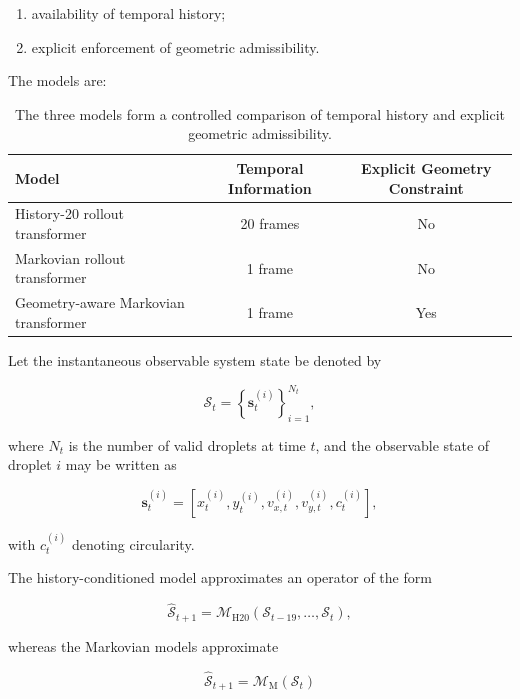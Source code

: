 \documentclass[11pt]{article}
\newcommand{\Mhist}{\mathcal{M}_{\mathrm{H20}}}
\newcommand{\Mmark}{\mathcal{M}_{\mathrm{M}}}
\begin{document}
\begin{enumerate}
    \item availability of temporal history;
    \item explicit enforcement of geometric admissibility.
\end{enumerate}

The models are:

\begin{table}[h]
\centering
\begin{tabular}{lcc}
\toprule
Model & Temporal Information & Explicit Geometry Constraint \\
\midrule
History-20 rollout transformer & 20 frames & No \\
Markovian rollout transformer & 1 frame & No \\
Geometry-aware Markovian transformer & 1 frame & Yes \\
\bottomrule
\end{tabular}
\caption{The three models form a controlled comparison of temporal history and explicit geometric admissibility.}
\end{table}

Let the instantaneous observable system state be denoted by

\begin{equation}
\mathcal{S}_t
=
\left\{
\mathbf{s}_t^{(i)}
\right\}_{i=1}^{N_t},
\end{equation}

where \(N_t\) is the number of valid droplets at time \(t\), and the observable state of droplet \(i\) may be written as

\begin{equation}
\mathbf{s}_t^{(i)}
=
\left[
x_t^{(i)},
y_t^{(i)},
v_{x,t}^{(i)},
v_{y,t}^{(i)},
c_t^{(i)}
\right],
\end{equation}

with \(c_t^{(i)}\) denoting circularity.

The history-conditioned model approximates an operator of the form

\begin{equation}
\hat{\mathcal{S}}_{t+1}
=
\Mhist
\left(
\mathcal{S}_{t-19},
\ldots,
\mathcal{S}_{t}
\right),
\end{equation}

whereas the Markovian models approximate

\begin{equation}
\hat{\mathcal{S}}_{t+1}
=
\Mmark
\left(
\mathcal{S}_{t}
\right)
\end{equation}
\end{document}
